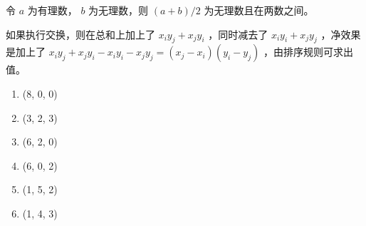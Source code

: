 {{        %
        \begin{practices}
            令 $a$ 为有理数， $b$ 为无理数，则 $(a + b) / 2$ 为无理数且在两数之间。
        \end{practices}

        \begin{practices}
            如果执行交换，则在总和上加上了 $x_iy_j + x_jy_i$ ，同时减去了 $x_iy_i + x_jy_j$ ，净效果是加上了 $x_iy_j + x_jy_i - x_iy_i - x_jy_j = (x_j - x_i)(y_i - y_j)$ ，由排序规则可求出值。
        \end{practices}

        \begin{practices}
            \begin{enumerate}[1.]
                \item (8, 0, 0)
                \item (3, 2, 3)
                \item (6, 2, 0)
                \item (6, 0, 2)
                \item (1, 5, 2)
                \item (1, 4, 3)
            \end{enumerate}
        \end{practices}

}}
